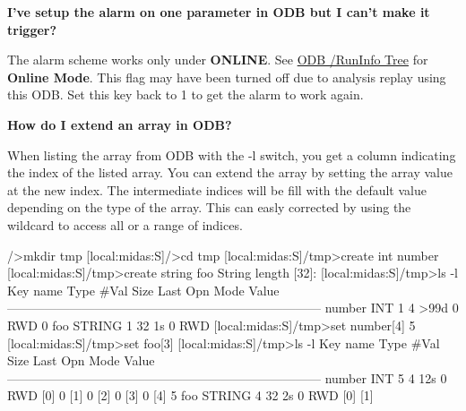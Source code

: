 \begin{DoxyEnumerate}
\begin{DoxyItemize}
\end{DoxyItemize}
\item {\bfseries  I've setup the alarm on one parameter in ODB but I can't make it trigger? }
\begin{DoxyItemize}
\item The alarm scheme works only under {\bfseries ONLINE}. See \hyperlink{RC_Run_States_and_Transitions_RC_ODB_RunInfo_Tree}{ODB /RunInfo Tree} for {\bfseries  Online Mode}. This flag may have been turned off due to analysis replay using this ODB. Set this key back to 1 to get the alarm to work again. \par
\par
 
\end{DoxyItemize}
\item {\bfseries  How do I extend an array in ODB? }
\begin{DoxyItemize}
\item When listing the array from ODB with the -\/l switch, you get a column indicating the index of the listed array. You can extend the array by setting the array value at the new index. The intermediate indices will be fill with the default value depending on the type of the array. This can easly corrected by using the wildcard to access all or a range of indices. 
\begin{DoxyCode}
/>mkdir tmp
[local:midas:S]/>cd tmp
[local:midas:S]/tmp>create int number
[local:midas:S]/tmp>create string foo
String length [32]: 
[local:midas:S]/tmp>ls -l
Key name                        Type    #Val  Size  Last Opn Mode Value
---------------------------------------------------------------------------
number                          INT     1     4     >99d 0   RWD  0
foo                             STRING  1     32    1s   0   RWD  
[local:midas:S]/tmp>set number[4] 5
[local:midas:S]/tmp>set foo[3]
[local:midas:S]/tmp>ls -l
Key name                        Type    #Val  Size  Last Opn Mode Value
---------------------------------------------------------------------------
number                          INT     5     4     12s  0   RWD  
                                        [0]             0
                                        [1]             0
                                        [2]             0
                                        [3]             0
                                        [4]             5
foo                             STRING  4     32    2s   0   RWD  
                                        [0]             
                                        [1]             

\end{DoxyCode}
\end{DoxyItemize}
\end{DoxyEnumerate}
